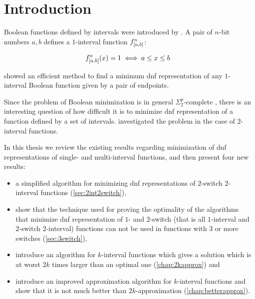 \chapter*{Introduction}


Boolean functions defined by intervals were introduced
by \citet{Schieber2005154}.
A pair of $n$-bit numbers $a, b$
defines a $1$-interval function
$f^{n}_{[a, b]}$:

$$
f^{n}_{[a, b]} (x) = 1
\iff a \leq x \leq b
$$

\citeauthor{Schieber2005154} showed an efficient method
to find a minimum \acrfull{dnf} representation
of any $1$-interval Boolean function
given by a pair of endpoints.\citep{Schieber2005154}

Since the problem of Boolean minimization is in general
$\Sigma_2^p$-complete \citep{Umans1998},
there is an interesting question of how difficult it is
to minimize \acrshort{dnf} representation of
a function defined by a set of intervals.
\citeauthor{Dubovsky2012} investigated the problem
in the case of $2$-interval functions.\citep{Dubovsky2012}

In this thesis we review the existing results regarding
minimization of \acrshort{dnf} representations of
single- and multi-interval functions,
and then present four new results:

\begin{itemize}
\item a simplified algorithm
for minimizing \acrshort{dnf} representations
of $2$-switch
$2$-interval functions (\cref{sec:2int2switch}),
\item
show that the technique used for proving the optimality
of the algorithms that minimize
\acrshort{dnf} representation
of $1$- and $2$-switch
(that is all $1$-interval
and $2$-switch $2$-interval)
functions
can not be used in
functions with $3$ or more switches
(\cref{sec:3switch}),
\item
introduce an algorithm
for $k$-interval functions
which gives a solution which is at worst
$2k$ times larger than an optimal one
(\cref{chap:2kapprox}) and
\item
introduce an improved approximation algorithm
for $k$-interval functions
and show that it is not much better than $2k$-approximation
(\cref{chap:betterapprox}).
\end{itemize}
